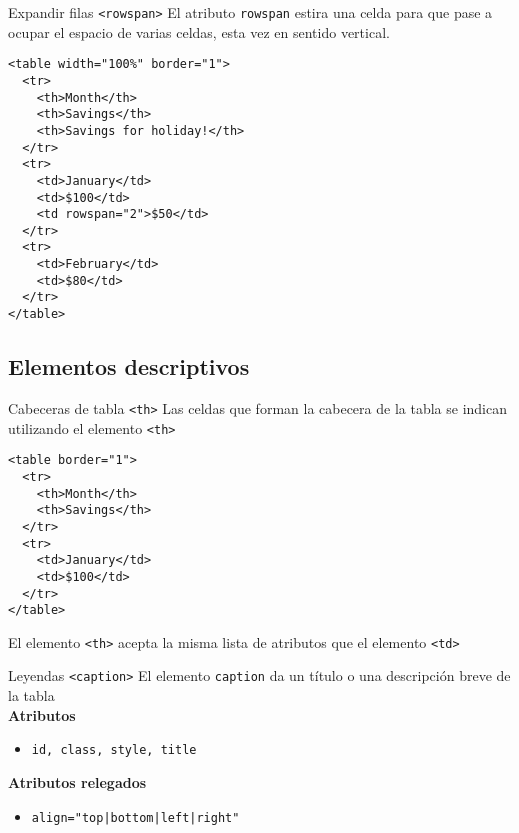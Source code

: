 \documentclass{beamer}
\begin{document}
\begin{frame}[fragile]{Expandir filas \texttt{<rowspan>}} %
    El atributo \texttt{rowspan} estira una celda para que pase a ocupar el
    espacio de varias celdas, esta vez en sentido vertical. 
    \begin{lstlisting}
<table width="100%" border="1">
  <tr>
    <th>Month</th>
    <th>Savings</th>
    <th>Savings for holiday!</th>
  </tr>
  <tr>
    <td>January</td>
    <td>$100</td>
    <td rowspan="2">$50</td>
  </tr>
  <tr>
    <td>February</td>
    <td>$80</td>
  </tr>
</table>
    \end{lstlisting}
\end{frame}


\subsection{Elementos descriptivos} %

\begin{frame}[fragile]{Cabeceras de tabla \texttt{<th>}} %
    Las celdas que forman la cabecera de la tabla se indican utilizando el
    elemento  \texttt{<th>} \\
    \begin{lstlisting}
<table border="1">
  <tr>
    <th>Month</th>
    <th>Savings</th>
  </tr>
  <tr>
    <td>January</td>
    <td>$100</td>
  </tr>
</table>
    \end{lstlisting}
    El elemento \texttt{<th>} acepta la misma lista de atributos que el
    elemento \texttt{<td>}
\end{frame}

\begin{frame}[fragile]{Leyendas \texttt{<caption>} } %
    El elemento \texttt{caption} da un título o una descripción breve de la
    tabla\\[0.2cm]
    \textbf{Atributos}
    \begin{itemize}
        \item \texttt{id, class, style, title} 
    \end{itemize}


    \textbf{Atributos relegados}
    \begin{itemize}
        \item \texttt{align="top|bottom|left|right"}
    \end{itemize}

\end{frame}
\end{document}
